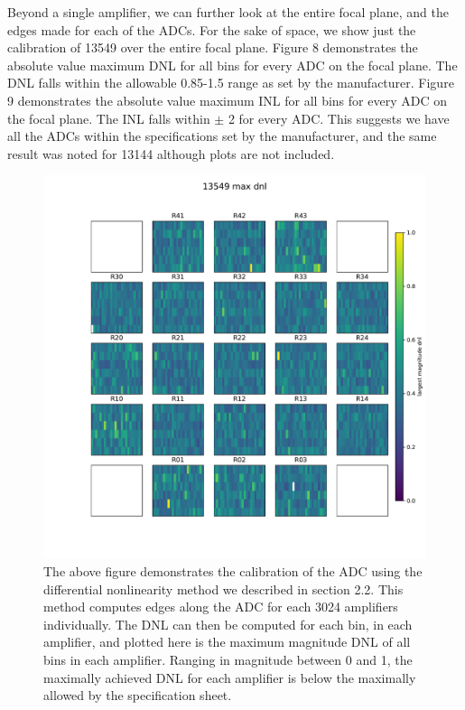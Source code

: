 \documentclass[11pt, letterpaper]{article}
\begin{document}
Beyond a single amplifier, we can further look at the entire focal plane, and the edges made for each of the ADCs. 
For the sake of space, we show just the calibration of 13549 over the entire focal plane. 
Figure 8 demonstrates the absolute value maximum DNL for all bins for every ADC on the focal plane. 
The DNL falls within the allowable 0.85-1.5 range as set by the manufacturer.  
Figure 9 demonstrates the absolute value maximum INL for all bins for every ADC on the focal plane. 
The INL falls within $\pm$ 2 for every ADC. 
This suggests we have all the ADCs within the specifications set by the manufacturer, and the same result was noted for 13144 although plots are not included. 

\begin{figure}
    \centering
    \includegraphics[width=0.5\linewidth]{maxdnlplot.pdf}
    \caption{The above figure demonstrates the calibration of the ADC using the differential nonlinearity method we described in section 2.2. This method computes edges along the ADC for each 3024 amplifiers individually. The DNL can then be computed for each bin, in each amplifier, and plotted here is the maximum magnitude DNL of all bins in each amplifier. Ranging in magnitude between 0 and 1, the maximally achieved DNL for each amplifier is below the maximally allowed by the specification sheet. }
\end{figure}
\end{document}
